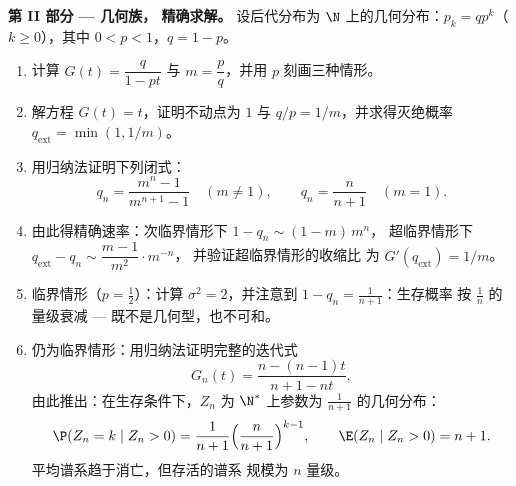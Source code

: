 \begin{problem}
\medskip
\noindent\textbf{第 II 部分 --- 几何族，
精确求解。} 设后代分布为 $\N$ 上的几何分布：$p_k =
qp^k$（$k \geq 0$），其中 $0 < p < 1$，$q = 1 - p$。
\begin{enumerate}[resume]
  \item 计算 $G(t) = \dfrac{q}{1 - pt}$ 与 $m = \dfrac
        pq$，并用 $p$ 刻画三种情形。
  \item 解方程 $G(t) = t$，证明不动点为 $1$ 与
        $q/p = 1/m$，并求得灭绝概率
        $q_{\mathrm{ext}} = \min(1, 1/m)$。
  \item 用归纳法证明下列闭式：
        \[
        q_n = \frac{m^n - 1}{m^{n+1} - 1} \quad (m \neq 1),
        \qquad
        q_n = \frac{n}{n+1} \quad (m = 1).
        \]
  \item 由此得精确速率：次临界情形下 $1 - q_n \sim (1 - m)\,m^n$，
        超临界情形下 $q_{\mathrm{ext}} - q_n
        \sim \dfrac{m - 1}{m^{2}}\cdot m^{-n}$，
        并验证超临界情形的收缩比
        为 $G'(q_{\mathrm{ext}}) = 1/m$。
  \item 临界情形（$p = \tfrac12$）：计算 $\sigma^2 =
        2$，并注意到 $1 - q_n = \frac1{n+1}$：生存概率
        按 $\frac1n$ 的量级衰减 --- 既不是几何型，也不可和。
  \item 仍为临界情形：用归纳法证明完整的迭代式
        \[
        G_n(t) = \frac{n - (n-1)t}{n + 1 - nt},
        \]
        由此推出：在生存条件下，$Z_n$ 为
        $\N^*$ 上参数为 $\frac1{n+1}$ 的几何分布：
        \[
        \P(Z_n = k \mid Z_n > 0) = \frac1{n+1}
        \Bigl(\frac{n}{n+1}\Bigr)^{k-1},
        \qquad
        \E(Z_n \mid Z_n > 0) = n + 1 .
        \]
        平均谱系趋于消亡，但存活的谱系
        规模为 $n$ 量级。
\end{enumerate}


\end{problem}
